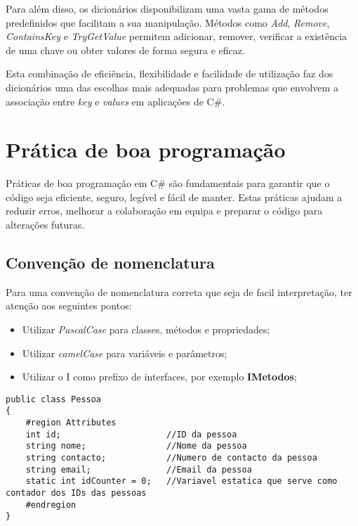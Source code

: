 \documentclass[11pt]{scrartcl} %
\begin{document}
Para além disso, os dicionários disponibilizam uma vasta gama de métodos predefinidos que facilitam a sua manipulação. Métodos como \textit{Add}, \textit{Remove}, \textit{ContainsKey} e \textit{TryGetValue} permitem adicionar, remover, verificar a existência de uma chave ou obter valores de forma segura e eficaz.

Esta combinação de eficiência, flexibilidade e facilidade de utilização faz dos dicionários uma das escolhas mais adequadas para problemas que envolvem a associação entre \textit{key} e \textit{values} em aplicações de C\#.


\newpage
\newpage

\section{Prática de boa programação}

Práticas de boa programação em C\# são fundamentais para garantir que o código seja eficiente, seguro, legível e fácil de manter. Estas práticas ajudam a reduzir erros, melhorar a colaboração em equipa e preparar o código para alterações futuras.

\subsection{Convenção de nomenclatura}
Para uma convenção de nomenclatura correta que seja de facil interpretação, ter atenção aos seguintes pontos: 

\begin{itemize}
	\item Utilizar \textit{PascalCase} para classes, métodos e propriedades; 
	\item Utilizar \textit{camelCase} para variáveis e parâmetros;
	\item Utilizar o I como prefixo de interfaces, por exemplo \textbf{IMetodos};
\end{itemize}

\begin{lstlisting}[language={[Sharp]C}, caption={Exemplo de nomenclatura correta}, label={Nomenclatura correta}]
	public class Pessoa
{
	#region Attributes
	int id;                     //ID da pessoa
	string nome;                //Nome da pessoa
	string contacto;            //Numero de contacto da pessoa
	string email;               //Email da pessoa
	static int idCounter = 0;   //Variavel estatica que serve como contador dos IDs das pessoas
	#endregion
}
\end{lstlisting}
\end{document}
